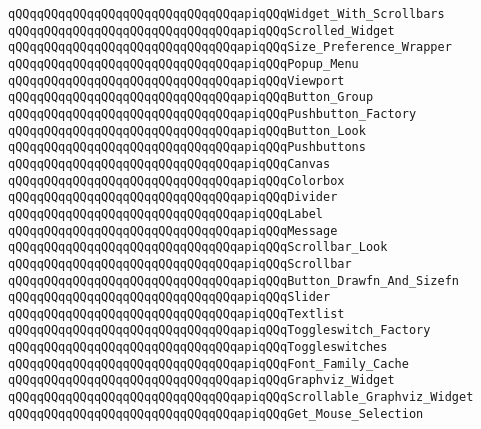 \verb|qQQqqQQqqQQqqQQqqQQqqQQqqQQqqQQqapiqQQqWidget_With_Scrollbars|\newline
\verb|qQQqqQQqqQQqqQQqqQQqqQQqqQQqqQQqapiqQQqScrolled_Widget|\newline
\verb|qQQqqQQqqQQqqQQqqQQqqQQqqQQqqQQqapiqQQqSize_Preference_Wrapper|\newline
\verb|qQQqqQQqqQQqqQQqqQQqqQQqqQQqqQQqapiqQQqPopup_Menu|\newline
\verb|qQQqqQQqqQQqqQQqqQQqqQQqqQQqqQQqapiqQQqViewport|\newline
\verb|qQQqqQQqqQQqqQQqqQQqqQQqqQQqqQQqapiqQQqButton_Group|\newline
\verb|qQQqqQQqqQQqqQQqqQQqqQQqqQQqqQQqapiqQQqPushbutton_Factory|\newline
\verb|qQQqqQQqqQQqqQQqqQQqqQQqqQQqqQQqapiqQQqButton_Look|\newline
\verb|qQQqqQQqqQQqqQQqqQQqqQQqqQQqqQQqapiqQQqPushbuttons|\newline
\verb|qQQqqQQqqQQqqQQqqQQqqQQqqQQqqQQqapiqQQqCanvas|\newline
\verb|qQQqqQQqqQQqqQQqqQQqqQQqqQQqqQQqapiqQQqColorbox|\newline
\verb|qQQqqQQqqQQqqQQqqQQqqQQqqQQqqQQqapiqQQqDivider|\newline
\verb|qQQqqQQqqQQqqQQqqQQqqQQqqQQqqQQqapiqQQqLabel|\newline
\verb|qQQqqQQqqQQqqQQqqQQqqQQqqQQqqQQqapiqQQqMessage|\newline
\verb|qQQqqQQqqQQqqQQqqQQqqQQqqQQqqQQqapiqQQqScrollbar_Look|\newline
\verb|qQQqqQQqqQQqqQQqqQQqqQQqqQQqqQQqapiqQQqScrollbar|\newline
\verb|qQQqqQQqqQQqqQQqqQQqqQQqqQQqqQQqapiqQQqButton_Drawfn_And_Sizefn|\newline
\verb|qQQqqQQqqQQqqQQqqQQqqQQqqQQqqQQqapiqQQqSlider|\newline
\verb|qQQqqQQqqQQqqQQqqQQqqQQqqQQqqQQqapiqQQqTextlist|\newline
\verb|qQQqqQQqqQQqqQQqqQQqqQQqqQQqqQQqapiqQQqToggleswitch_Factory|\newline
\verb|qQQqqQQqqQQqqQQqqQQqqQQqqQQqqQQqapiqQQqToggleswitches|\newline
\verb|qQQqqQQqqQQqqQQqqQQqqQQqqQQqqQQqapiqQQqFont_Family_Cache|\newline
\verb|qQQqqQQqqQQqqQQqqQQqqQQqqQQqqQQqapiqQQqGraphviz_Widget|\newline
\verb|qQQqqQQqqQQqqQQqqQQqqQQqqQQqqQQqapiqQQqScrollable_Graphviz_Widget|\newline
\verb|qQQqqQQqqQQqqQQqqQQqqQQqqQQqqQQqapiqQQqGet_Mouse_Selection|\newline
